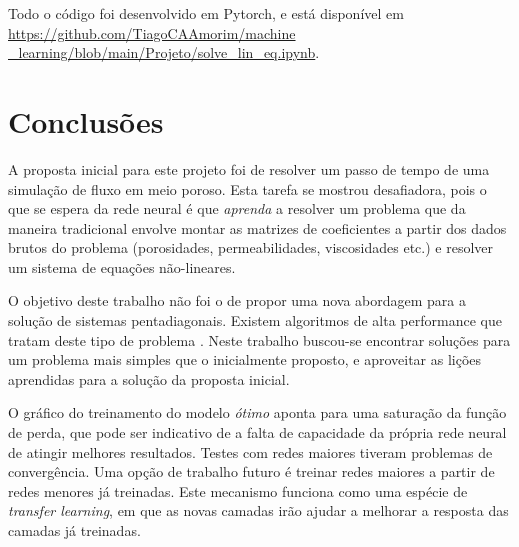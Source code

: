 \documentclass[final,5p]{elsarticle}
\numberwithin{equation}{section}
\begin{document}
    Todo o código foi desenvolvido em Pytorch, e está disponível em \href{https://github.com/TiagoCAAmorim/machine\_learning/blob/main/Projeto/solve_lin_eq.ipynb}{https://github.com/TiagoCAAmorim/machine \_learning/blob/main/Projeto/solve\_lin\_eq.ipynb}.


\section{Conclusões}

    A proposta inicial para este projeto foi de resolver um passo de tempo de uma simulação de fluxo em meio poroso. Esta tarefa se mostrou desafiadora, pois o que se espera da rede neural é que \emph{aprenda} a resolver um problema que da maneira tradicional envolve montar as matrizes de coeficientes a partir dos dados brutos do problema (porosidades, permeabilidades, viscosidades etc.) e resolver um sistema de equações não-lineares.

    O objetivo deste trabalho não foi o de propor uma nova abordagem para a solução de sistemas pentadiagonais. Existem algoritmos de alta performance que tratam deste tipo de problema \cite{levit1989parallel,ivanov1998parallel,carroll2021batched}. Neste trabalho buscou-se encontrar soluções para um problema mais simples que o inicialmente proposto, e aproveitar as lições aprendidas para a solução da proposta inicial.

    O gráfico do treinamento do modelo \emph{ótimo} aponta para uma saturação da função de perda, que pode ser indicativo de a falta de capacidade da própria rede neural de atingir melhores resultados. Testes com redes maiores tiveram problemas de convergência. Uma opção de trabalho futuro é treinar redes maiores a partir de redes menores já treinadas. Este mecanismo funciona como uma espécie de \emph{transfer learning}, em que as novas camadas irão ajudar a melhorar a resposta das camadas já treinadas.















\end{document}
